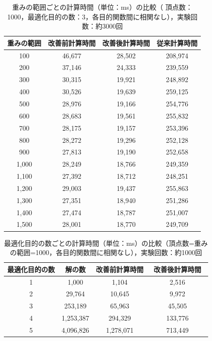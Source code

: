 \documentclass[12pt]{optlab-bachelor}
\begin{document}
\begin{table}[h]
  \centering
  \caption{重みの範囲ごとの計算時間（単位：ms）の比較（
  頂点数：1000，最適化目的の数：3，各目的関数間に相関なし），実験回数：約3000回}
  {\small
  \begin{tabular}{|c|c|c|c|} \hline
    重みの範囲 & 改善前計算時間 & 改善後計算時間 & 従来計算時間 \\ \hline
    100 & 46,677 & 28,502 & 208,974 \\ \hline
    200 & 37,146 & 24,333 & 239,559 \\ \hline
    300 & 30,315 & 19,921 & 248,892 \\ \hline
    400 & 30,526 & 19,639 & 259,125 \\ \hline
    500 & 28,976 & 19,166 & 254,776 \\ \hline
    600 & 28,683 & 19,561 & 255,832 \\ \hline
    700 & 28,175 & 19,157 & 253,396 \\ \hline
    800 & 28,272 & 19,296 & 252,128 \\ \hline
    900 & 27,813 & 19,190 & 252,658 \\ \hline
    1,000 & 28,249 & 18,766 & 249,359 \\ \hline
    1,100 & 27,392 & 	18,712 & 	248,251 \\ \hline
    1,200 & 29,003 & 	19,437	 & 255,863 \\ \hline
    1,300 & 27,351 & 	18,940 & 	251,286 \\ \hline
    1,400 & 27,474 & 	18,787 & 	251,007 \\ \hline
    1,500 & 28,001 & 	18,770 & 	249,709 \\ \hline
  \end{tabular}
  }
\end{table}

\begin{table}[h]
  \centering
  \caption{最適化目的の数ごとの計算時間（単位：ms）の比較（頂点数=重みの範囲=1000，各目的関数間に相関なし），実験回数：約1000回}
  {\small
  \begin{tabular}{|c|c|c|c|} \hline
    最適化目的の数 & 解の数 & 改善前計算時間 & 改善後計算時間　\\ \hline
    1 & 	1,000 & 	1,104 & 	2,516　\\ \hline
    2 & 	29,764	 & 10,645 & 	9,972　\\ \hline
    3 & 	253,189	 & 65,963 & 	45,505　\\ \hline
    4 & 	1,253,387	 & 294,329	 & 133,776　\\ \hline
    5 & 	4,096,826	 & 1,278,071	 & 713,449　\\ \hline
  \end{tabular}
  }
\end{table}
\end{document}

